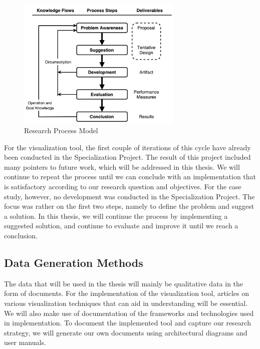 \begin{figure}[h!]
    \centering
        \includegraphics[width=0.7\textwidth]{fig/dsr-cycle.pdf}
        \caption{Research Process Model}
        \label{fig:dsr-cycle}
\end{figure}

\noindent For the visualization tool, the first couple of iterations of this cycle have already been conducted in the Specialization Project. The result of this project included many pointers to future work, which will be addressed in this thesis. We will continue to repeat the process until we can conclude with an implementation that is satisfactory according to our research question and objectives. For the case study, however, no development was conducted in the Specialization Project. The focus was rather on the first two steps, namely to define the problem and suggest a solution. In this thesis, we will continue the process by implementing a suggested solution, and continue to evaluate and improve it until we reach a conclusion.\\

\subsection{Data Generation Methods} \label{sec:data-generation-methods}

The data that will be used in the thesis will mainly be qualitative data in the form of documents. For the implementation of the visualization tool, articles on various visualization techniques that can aid in understanding  will be essential. We will also make use of documentation of the frameworks and technologies used in implementation. To document the implemented tool and capture our research strategy, we will generate our own documents using architectural diagrams and user manuals. \\

